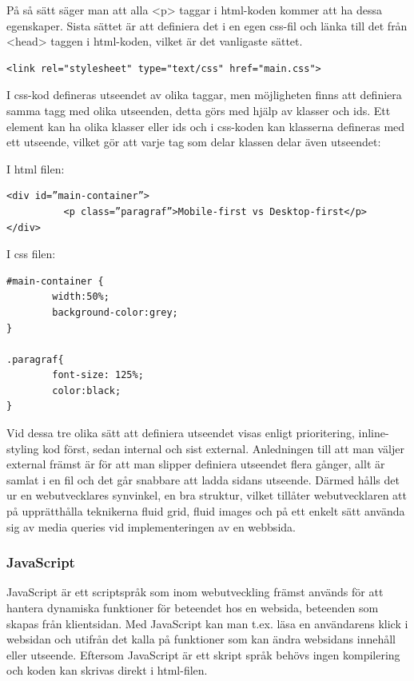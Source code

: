 \documentclass[11pt]{article}
\begin{document}
På så sätt säger man att alla <p> taggar i html-koden kommer att ha dessa egenskaper. Sista sättet är att definiera det i en egen css-fil och länka till det från <head> taggen i html-koden, vilket är det vanligaste sättet. 
\vspace{0.3cm}
\begin{verbatim}
<link rel="stylesheet" type="text/css" href="main.css">
\end{verbatim}
\vspace{0.5cm}

I css-kod defineras utseendet av olika taggar, men möjligheten finns att definiera samma tagg med olika utseenden, detta görs med hjälp av klasser och ids. Ett element kan ha olika klasser eller ids och i css-koden kan klasserna defineras med ett utseende, vilket gör att varje tag som delar klassen delar även utseendet:

\vspace{0.3cm}
I html filen:

\begin{verbatim}
<div id=”main-container”>
          <p class=”paragraf”>Mobile-first vs Desktop-first</p>
</div>
\end{verbatim}
\vspace{0.5cm}
I css filen:

\begin{verbatim}
#main-container {
        width:50%;
        background-color:grey;
}

.paragraf{
        font-size: 125%;
        color:black;
}
\end{verbatim}
\vspace{1cm}

Vid dessa tre olika sätt att definiera utseendet visas enligt prioritering, inline-styling kod först, sedan internal och sist external. Anledningen till att man väljer external främst är för att man slipper definiera utseendet flera gånger, allt är samlat i en fil och det går snabbare att ladda sidans utseende. Därmed hålls det ur en webutvecklares synvinkel, en bra struktur, vilket tillåter webutvecklaren att på upprätthålla teknikerna fluid grid, fluid images och på ett enkelt sätt använda sig av media queries vid implementeringen av en webbsida.

\subsubsection{JavaScript}
JavaScript är ett scriptspråk som inom webutveckling främst används för att hantera dynamiska funktioner för beteendet hos en websida, beteenden som skapas från klientsidan. Med JavaScript kan man t.ex. läsa en användarens klick i websidan och utifrån det kalla på funktioner som kan ändra websidans innehåll eller utseende. Eftersom JavaScript är ett skript språk behövs ingen kompilering och koden kan skrivas direkt i html-filen.
\end{document}
